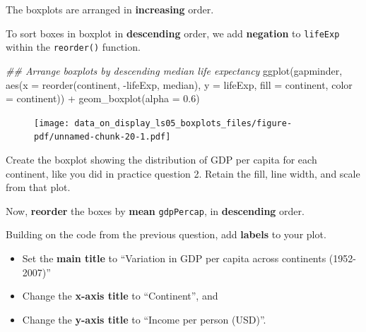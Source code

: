 \documentclass[
  letterpaper,
  DIV=11,
  numbers=noendperiod]{scrreprt}
\newenvironment{Shaded}{\begin{snugshade}}{\end{snugshade}}
\newcommand{\AttributeTok}[1]{\textcolor[rgb]{0.40,0.45,0.13}{#1}}
\newcommand{\DocumentationTok}[1]{\textcolor[rgb]{0.37,0.37,0.37}{\textit{#1}}}
\newcommand{\FloatTok}[1]{\textcolor[rgb]{0.68,0.00,0.00}{#1}}
\newcommand{\FunctionTok}[1]{\textcolor[rgb]{0.28,0.35,0.67}{#1}}
\newcommand{\NormalTok}[1]{\textcolor[rgb]{0.00,0.23,0.31}{#1}}
\newcommand{\SpecialCharTok}[1]{\textcolor[rgb]{0.37,0.37,0.37}{#1}}
\begin{document}
The boxplots are arranged in \textbf{increasing} order.

To sort boxes in boxplot in \textbf{descending} order, we add
\textbf{negation} to \texttt{lifeExp} within the \texttt{reorder()}
function.

\begin{Shaded}
\begin{Highlighting}[]
\DocumentationTok{\#\# Arrange boxplots by descending median life expectancy}
\FunctionTok{ggplot}\NormalTok{(gapminder, }
       \FunctionTok{aes}\NormalTok{(}\AttributeTok{x =} \FunctionTok{reorder}\NormalTok{(continent, }\SpecialCharTok{{-}}\NormalTok{lifeExp, median),}
           \AttributeTok{y =}\NormalTok{ lifeExp, }
           \AttributeTok{fill =}\NormalTok{ continent,}
           \AttributeTok{color =}\NormalTok{ continent)) }\SpecialCharTok{+}
  \FunctionTok{geom\_boxplot}\NormalTok{(}\AttributeTok{alpha =} \FloatTok{0.6}\NormalTok{)}
\end{Highlighting}
\end{Shaded}

\begin{figure}[H]

{\centering \texttt{[image: data\_on\_display\_ls05\_boxplots\_files/figure-pdf/unnamed-chunk-20-1.pdf]}

}

\end{figure}

\begin{tcolorbox}[enhanced jigsaw, colframe=quarto-callout-tip-color-frame, rightrule=.15mm, opacityback=0, breakable, coltitle=black, colbacktitle=quarto-callout-tip-color!10!white, bottomrule=.15mm, leftrule=.75mm, toprule=.15mm, arc=.35mm, bottomtitle=1mm, colback=white, left=2mm, opacitybacktitle=0.6, titlerule=0mm, title=\textcolor{quarto-callout-tip-color}{\faLightbulb}\hspace{0.5em}{Practice}, toptitle=1mm]

Create the boxplot showing the distribution of GDP per capita for each
continent, like you did in practice question 2. Retain the fill, line
width, and scale from that plot.

Now, \textbf{reorder} the boxes by \textbf{mean} \texttt{gdpPercap}, in
\textbf{descending} order.

Building on the code from the previous question, add \textbf{labels} to
your plot.

\begin{itemize}
\item
  Set the \textbf{main title} to ``Variation in GDP per capita across
  continents (1952-2007)''
\item
  Change the \textbf{x-axis title} to ``Continent'', and
\item
  Change the \textbf{y-axis title} to ``Income per person (USD)''.
\end{itemize}

\end{tcolorbox}
\end{document}
